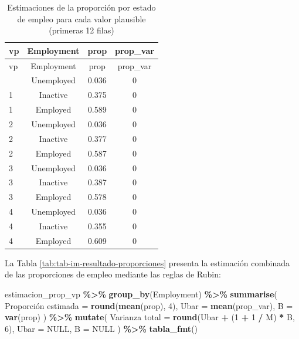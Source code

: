 \documentclass[
  spanish,
  12pt,
]{book}
\newenvironment{Shaded}{\begin{snugshade}}{\end{snugshade}}
\newcommand{\AttributeTok}[1]{\textcolor[rgb]{0.13,0.29,0.53}{#1}}
\newcommand{\ConstantTok}[1]{\textcolor[rgb]{0.56,0.35,0.01}{#1}}
\newcommand{\DecValTok}[1]{\textcolor[rgb]{0.00,0.00,0.81}{#1}}
\newcommand{\FunctionTok}[1]{\textcolor[rgb]{0.13,0.29,0.53}{\textbf{#1}}}
\newcommand{\NormalTok}[1]{#1}
\newcommand{\OtherTok}[1]{\textcolor[rgb]{0.56,0.35,0.01}{#1}}
\newcommand{\SpecialCharTok}[1]{\textcolor[rgb]{0.81,0.36,0.00}{\textbf{#1}}}
\newcommand{\StringTok}[1]{\textcolor[rgb]{0.31,0.60,0.02}{#1}}
\begin{document}
\begin{longtable}[]{@{}lccc@{}}
\caption{\label{tab:tab-vp-proporciones}Estimaciones de la proporción por estado de empleo para cada valor plausible (primeras 12 filas)}\tabularnewline
\toprule\noalign{}
vp & Employment & prop & prop\_var \\
\midrule\noalign{}
\endfirsthead
\toprule\noalign{}
vp & Employment & prop & prop\_var \\
\midrule\noalign{}
\endhead
\bottomrule\noalign{}
\endlastfoot
1 & Unemployed & 0.036 & 0 \\
1 & Inactive & 0.375 & 0 \\
1 & Employed & 0.589 & 0 \\
2 & Unemployed & 0.036 & 0 \\
2 & Inactive & 0.377 & 0 \\
2 & Employed & 0.587 & 0 \\
3 & Unemployed & 0.036 & 0 \\
3 & Inactive & 0.387 & 0 \\
3 & Employed & 0.578 & 0 \\
4 & Unemployed & 0.036 & 0 \\
4 & Inactive & 0.355 & 0 \\
4 & Employed & 0.609 & 0 \\
\end{longtable}

La Tabla \ref{tab:tab-im-resultado-proporciones} presenta la estimación combinada de las proporciones de empleo mediante las reglas de Rubin:

\begin{Shaded}
\begin{Highlighting}[]
\NormalTok{estimacion\_prop\_vp }\SpecialCharTok{\%\textgreater{}\%}
  \FunctionTok{group\_by}\NormalTok{(Employment) }\SpecialCharTok{\%\textgreater{}\%}
  \FunctionTok{summarise}\NormalTok{(}
    \StringTok{\textasciigrave{}}\AttributeTok{Proporción estimada}\StringTok{\textasciigrave{}} \OtherTok{=} \FunctionTok{round}\NormalTok{(}\FunctionTok{mean}\NormalTok{(prop), }\DecValTok{4}\NormalTok{),}
    \AttributeTok{Ubar                  =} \FunctionTok{mean}\NormalTok{(prop\_var),}
    \AttributeTok{B                     =} \FunctionTok{var}\NormalTok{(prop)}
\NormalTok{  ) }\SpecialCharTok{\%\textgreater{}\%}
  \FunctionTok{mutate}\NormalTok{(}
    \StringTok{\textasciigrave{}}\AttributeTok{Varianza total}\StringTok{\textasciigrave{}} \OtherTok{=} \FunctionTok{round}\NormalTok{(Ubar }\SpecialCharTok{+}\NormalTok{ (}\DecValTok{1} \SpecialCharTok{+} \DecValTok{1} \SpecialCharTok{/}\NormalTok{ M) }\SpecialCharTok{*}\NormalTok{ B, }\DecValTok{6}\NormalTok{),}
    \AttributeTok{Ubar =} \ConstantTok{NULL}\NormalTok{, }\AttributeTok{B =} \ConstantTok{NULL}
\NormalTok{  ) }\SpecialCharTok{\%\textgreater{}\%}
  \FunctionTok{tabla\_fmt}\NormalTok{()}
\end{Highlighting}
\end{Shaded}
\end{document}
